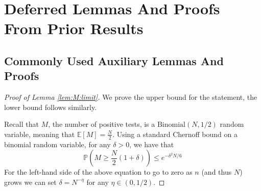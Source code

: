 \documentclass[12pt,reqno]{amsart}
\numberwithin{equation}{section}
\theoremstyle{definition}
\newcommand{\E}{\mathbb{E}}
\renewcommand{\P}{\mathbb{P}}
\newcommand{\Bi}[1]{\ensuremath{\text{Binomial}\left(#1\right)}}
\renewcommand{\[}{\begin{equation}}
\renewcommand{\]}{\end{equation}}
\renewcommand{\|}{\bigg{|}}
\begin{document}
\newpage
\medskip




\newpage
\medskip
\appendix

\section{Deferred Lemmas And Proofs From Prior Results}

\subsection{Commonly Used Auxiliary Lemmas And Proofs}\label{subsec:commonProofs}

\begin{proof}[Proof of Lemma \ref{lem:M:limit}]
We prove the upper bound for the statement, the lower bound follows similarly.

Recall that $M$, the number of positive tests, is a $\Bi{N, 1/2}$ random variable, meaning that $\E[M] = \frac{N}{2}$. Using a standard Chernoff bound on a binomial random variable, for any $\delta> 0$, we have that
\[\P\left(M \geq \frac{N}{2}(1 + \delta)\right) \leq e^{-\delta^2N/6}\]
For the left-hand side of the above equation to go to zero as $n$ (and thus $N$) grows we can set $\delta = N^{-\eta}$ for any $\eta \in (0,1/2)$. 
\end{proof}
\end{document}
